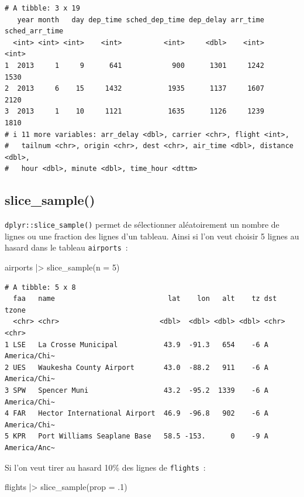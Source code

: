 \documentclass[
  letterpaper,
  DIV=11,
  numbers=noendperiod,
  oneside]{scrreprt}
\newenvironment{Shaded}{\begin{snugshade}}{\end{snugshade}}
\newcommand{\AttributeTok}[1]{\textcolor[rgb]{0.40,0.45,0.13}{#1}}
\newcommand{\DecValTok}[1]{\textcolor[rgb]{0.68,0.00,0.00}{#1}}
\newcommand{\FunctionTok}[1]{\textcolor[rgb]{0.28,0.35,0.67}{#1}}
\newcommand{\NormalTok}[1]{\textcolor[rgb]{0.00,0.23,0.31}{#1}}
\newcommand{\SpecialCharTok}[1]{\textcolor[rgb]{0.37,0.37,0.37}{#1}}
\begin{document}
\begin{verbatim}
# A tibble: 3 x 19
   year month   day dep_time sched_dep_time dep_delay arr_time sched_arr_time
  <int> <int> <int>    <int>          <int>     <dbl>    <int>          <int>
1  2013     1     9      641            900      1301     1242           1530
2  2013     6    15     1432           1935      1137     1607           2120
3  2013     1    10     1121           1635      1126     1239           1810
# i 11 more variables: arr_delay <dbl>, carrier <chr>, flight <int>,
#   tailnum <chr>, origin <chr>, dest <chr>, air_time <dbl>, distance <dbl>,
#   hour <dbl>, minute <dbl>, time_hour <dttm>
\end{verbatim}

\hypertarget{slice_sample}{%
\subsection{slice\_sample()}\label{slice_sample}}

\texttt{dplyr::slice\_sample()} permet de sélectionner aléatoirement un
nombre de lignes ou une fraction des lignes d'un tableau. Ainsi si l'on
veut choisir 5 lignes au hasard dans le tableau \texttt{airports}~:

\begin{Shaded}
\begin{Highlighting}[]
\NormalTok{airports }\SpecialCharTok{|\textgreater{}} 
  \FunctionTok{slice\_sample}\NormalTok{(}\AttributeTok{n =} \DecValTok{5}\NormalTok{)}
\end{Highlighting}
\end{Shaded}

\begin{verbatim}
# A tibble: 5 x 8
  faa   name                           lat    lon   alt    tz dst   tzone       
  <chr> <chr>                        <dbl>  <dbl> <dbl> <dbl> <chr> <chr>       
1 LSE   La Crosse Municipal           43.9  -91.3   654    -6 A     America/Chi~
2 UES   Waukesha County Airport       43.0  -88.2   911    -6 A     America/Chi~
3 SPW   Spencer Muni                  43.2  -95.2  1339    -6 A     America/Chi~
4 FAR   Hector International Airport  46.9  -96.8   902    -6 A     America/Chi~
5 KPR   Port Williams Seaplane Base   58.5 -153.      0    -9 A     America/Anc~
\end{verbatim}

Si l'on veut tirer au hasard 10\% des lignes de \texttt{flights}~:

\begin{Shaded}
\begin{Highlighting}[]
\NormalTok{flights }\SpecialCharTok{|\textgreater{}} 
  \FunctionTok{slice\_sample}\NormalTok{(}\AttributeTok{prop =}\NormalTok{ .}\DecValTok{1}\NormalTok{)}
\end{Highlighting}
\end{Shaded}
\end{document}
